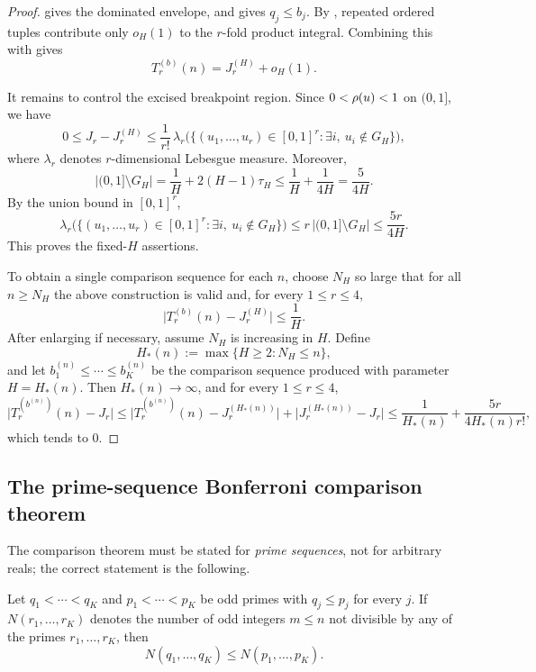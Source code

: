 \begin{proof}
 gives the dominated envelope,
and  gives $q_j\le b_j$.  By
, repeated ordered tuples contribute
only $o_H(1)$ to the $r$-fold product integral.  Combining this with
 gives
\[
  T_r^{(b)}(n)=J_r^{(H)}+o_H(1).
\]

It remains to control the excised breakpoint region.  Since
$0<\rho(u)<1$ on $(0,1]$, we have
\[
  0\le J_r-J_r^{(H)}
  \le
  \frac1{r!}\,
  \lambda_r\bigl(\{(u_1,\dots,u_r)\in[0,1]^r:\exists i,\ u_i\notin G_H\}\bigr),
\]
where $\lambda_r$ denotes $r$-dimensional Lebesgue measure.  Moreover,
\[
  |(0,1]\setminus G_H|
  =
  \frac1H+2(H-1)\tau_H
  \le
  \frac1H+\frac{1}{4H}
  =
  \frac{5}{4H}.
\]
By the union bound in $[0,1]^r$,
\[
  \lambda_r\bigl(\{(u_1,\dots,u_r)\in[0,1]^r:\exists i,\ u_i\notin G_H\}\bigr)
  \le
  r\,|(0,1]\setminus G_H|
  \le
  \frac{5r}{4H}.
\]
This proves the fixed-$H$ assertions.

To obtain a single comparison sequence for each $n$, choose $N_H$ so large
that for all $n\ge N_H$ the above construction is valid and, for every
$1\le r\le 4$,
\[
  \bigl|T_r^{(b)}(n)-J_r^{(H)}\bigr|\le \frac1H.
\]
After enlarging if necessary, assume $N_H$ is increasing in $H$.  Define
\[
  H_*(n):=\max\{H\ge 2:N_H\le n\},
\]
and let $b_1^{(n)}\le\cdots\le b_K^{(n)}$ be the comparison sequence produced
with parameter $H=H_*(n)$.  Then $H_*(n)\to\infty$, and for every
$1\le r\le 4$,
\[
  \bigl|T_r^{(b^{(n)})}(n)-J_r\bigr|
  \le
  \bigl|T_r^{(b^{(n)})}(n)-J_r^{(H_*(n))}\bigr|
  +
  \bigl|J_r^{(H_*(n))}-J_r\bigr|
  \le
  \frac{1}{H_*(n)}+\frac{5r}{4H_*(n)r!},
\]
which tends to $0$.
\end{proof}

\subsection{The prime-sequence Bonferroni comparison theorem}

The comparison theorem must be stated for \emph{prime sequences}, not for
arbitrary reals; the correct statement is the following.

\begin{lemma}
\label{lem:odd-sieve-monotonicity}
Let $q_1<\cdots<q_K$ and $p_1<\cdots<p_K$ be odd primes with
$q_j\le p_j$ for every $j$.  If $N(r_1,\ldots,r_K)$ denotes the number of odd
integers $m\le n$ not divisible by any of the primes $r_1,\ldots,r_K$, then
\[
  N(q_1,\ldots,q_K)\le N(p_1,\ldots,p_K).
\]
\end{lemma}

